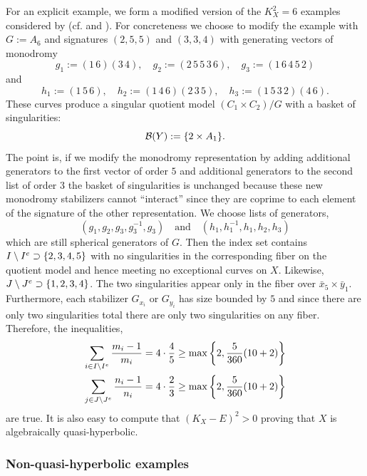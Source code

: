 \documentclass[main.tex]{subfiles}
\begin{document}
\begin{example}
For an explicit example, we form a modified version of the $K_X^2 = 6$ examples considered by \cite{lang_product_quotient} (cf. \cite[Table~1]{bauer:classification} and \cite[Table~2]{bauer:fundamental_groups}). For concreteness we choose to modify the example \cite[\S6.20]{bauer:fundamental_groups} with $G := A_6$ and signatures $(2,5,5)$ and $(3,3,4)$ with generating vectors of monodromy
\[ g_1 := (1 \, 6)(3 \, 4), \quad g_2 := (2 \, 5 \, 5 \, 3 \, 6), \quad g_3 := (1 \, 6 \, 4 \, 5 \, 2)  \]
and
\[ h_1 :=  (1\, 5\, 6), \quad h_2 := (1\, 4\, 6)(2\, 3\, 5), \quad h_3 := (1\, 5\, 3\, 2)(4\, 6). \]
These curves produce a singular quotient model $(C_1 \times C_2) / G$ with a basket of singularities:
\[ \mathcal{B}(Y) := \{ 2 \times A_1 \}. \]
The point is, if we modify the monodromy representation by adding additional generators to the first vector of order $5$ and additional generators to the second list of order $3$ the basket of singularities is unchanged because these new monodromy stabilizers cannot ``interact'' since they are coprime to each element of the signature of the other representation. We choose lists of generators,
\[ (g_1, g_2, g_3, g_3^{-1}, g_3) \quad \text{and} \quad (h_1, h_1^{-1}, h_1, h_2, h_3) \]
which are still spherical generators of $G$. Then the index set contains $I \setminus I^e \supset \{ 2,3,4,5 \}$ with no singularities in the corresponding fiber on the quotient model and hence meeting no exceptional curves on $X$. Likewise, $J \setminus J^e \supset \{ 1,2,3,4 \}$. The two singularities appear only in the fiber over $\bar{x}_5 \times \bar{y}_1$. Furthermore, each stabilizer $G_{x_i}$ or $G_{y_i}$ has size bounded by $5$ and since there are only two singularities total there are only two singularities on any fiber. Therefore, the inequalities,
\begin{align*}
\sum_{i \in I \setminus I^e} \frac{m_i - 1}{m_i} &= 4 \cdot \frac{4}{5} \ge \max \left\{ 2, \frac{5}{360} (10 + 2) \right\} 
\\
\sum_{j \in J \setminus J^e} \frac{n_i - 1}{n_i} &= 4 \cdot \frac{2}{3} \ge \max \left\{ 2, \frac{5}{360} (10 + 2) \right\} 
\end{align*}
are true. It is also easy to compute that $(K_X - E)^2 > 0$ proving that $X$ is algebraically quasi-hyperbolic. 
\end{example}

\subsubsection{Non-quasi-hyperbolic examples}
\end{document}
